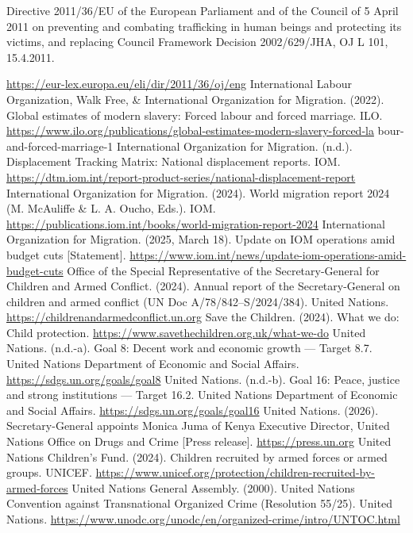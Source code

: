 
Directive 2011/36/EU of the European Parliament and of the Council of 5 April 2011 on preventing and combating trafficking in human beings and protecting its victims, and replacing Council Framework Decision 2002/629/JHA, OJ L 101, 15.4.2011.

\begin{referencelist}
   \url{https://eur-lex.europa.eu/eli/dir/2011/36/oj/eng}
   International Labour Organization, Walk Free, \& International Organization for Migration. (2022). Global estimates of modern slavery: Forced labour and forced marriage. ILO. \url{https://www.ilo.org/publications/global-estimates-modern-slavery-forced-la} bour-and-forced-marriage-1
   International Organization for Migration. (n.d.). Displacement Tracking Matrix: National displacement reports. IOM. \url{https://dtm.iom.int/report-product-series/national-displacement-report}
   International Organization for Migration. (2024). World migration report 2024 (M. McAuliffe \& L. A. Oucho, Eds.). IOM. \url{https://publications.iom.int/books/world-migration-report-2024}
   International Organization for Migration. (2025, March 18). Update on IOM operations amid budget cuts [Statement]. \url{https://www.iom.int/news/update-iom-operations-amid-budget-cuts}
   Office of the Special Representative of the Secretary-General for Children and Armed Conflict. (2024). Annual report of the Secretary-General on children and armed conflict (UN Doc A/78/842–S/2024/384). United Nations. \url{https://childrenandarmedconflict.un.org}
   Save the Children. (2024). What we do: Child protection. \url{https://www.savethechildren.org.uk/what-we-do}
   United Nations. (n.d.-a). Goal 8: Decent work and economic growth — Target 8.7. United Nations Department of Economic and Social Affairs. \url{https://sdgs.un.org/goals/goal8}
   United Nations. (n.d.-b). Goal 16: Peace, justice and strong institutions — Target 16.2. United Nations Department of Economic and Social Affairs. \url{https://sdgs.un.org/goals/goal16}
   United Nations. (2026). Secretary-General appoints Monica Juma of Kenya Executive Director, United Nations Office on Drugs and Crime [Press release]. \url{https://press.un.org}
   United Nations Children's Fund. (2024). Children recruited by armed forces or armed groups. UNICEF. \url{https://www.unicef.org/protection/children-recruited-by-armed-forces}
   United Nations General Assembly. (2000). United Nations Convention against Transnational Organized Crime (Resolution 55/25). United Nations. \url{https://www.unodc.org/unodc/en/organized-crime/intro/UNTOC.html}

\end{referencelist}
